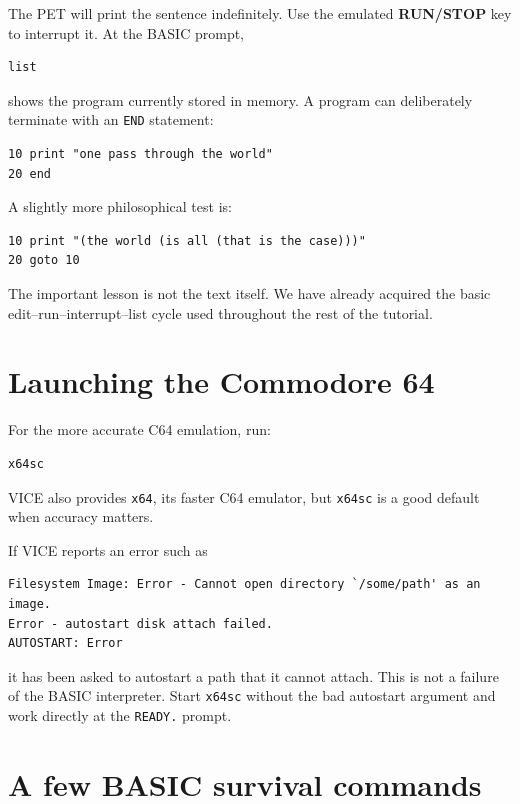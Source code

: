 \documentclass[11pt]{article}
\begin{document}
The PET will print the sentence indefinitely. Use the emulated \textbf{RUN/STOP} key to interrupt it. At the BASIC prompt,

\begin{lstlisting}[style=basic]
list
\end{lstlisting}

shows the program currently stored in memory. A program can deliberately terminate with an \texttt{END} statement:

\begin{lstlisting}[style=basic]
10 print "one pass through the world"
20 end
\end{lstlisting}

A slightly more philosophical test is:

\begin{lstlisting}[style=basic]
10 print "(the world (is all (that is the case)))"
20 goto 10
\end{lstlisting}

The important lesson is not the text itself. We have already acquired the basic edit--run--interrupt--list cycle used throughout the rest of the tutorial.

\section{Launching the Commodore 64}

For the more accurate C64 emulation, run:

\begin{lstlisting}[style=shell]
x64sc
\end{lstlisting}

VICE also provides \texttt{x64}, its faster C64 emulator, but \texttt{x64sc} is a good default when accuracy matters.

If VICE reports an error such as

\begin{lstlisting}[style=shell]
Filesystem Image: Error - Cannot open directory `/some/path' as an image.
Error - autostart disk attach failed.
AUTOSTART: Error
\end{lstlisting}

it has been asked to autostart a path that it cannot attach. This is not a failure of the BASIC interpreter. Start \texttt{x64sc} without the bad autostart argument and work directly at the \texttt{READY.} prompt.

\section{A few BASIC survival commands}
\end{document}
